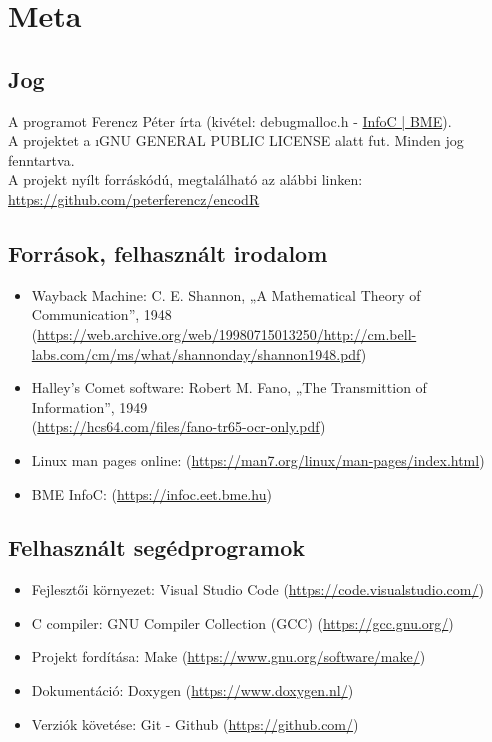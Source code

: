\chapter{Meta}
\section{Jog}
A programot Ferencz Péter írta (kivétel: debugmalloc.h - \href{https://infoc.eet.bme.hu/debugmalloc/}{InfoC | BME}). \\
A projektet a {\i GNU GENERAL PUBLIC LICENSE} alatt fut. Minden jog fenntartva.\\
A projekt nyílt forráskódú, megtalálható az alábbi linken: \href{https://github.com/peterferencz/encodR}{https://github.com/peterferencz/encodR}


\section{Források, felhasznált irodalom}
\begin{itemize}
    \item Wayback Machine: C. E. Shannon, „A Mathematical Theory of Communication”, 1948 \\
        (\href{https://web.archive.org/web/19980715013250/http://cm.bell-labs.com/cm/ms/what/shannonday/shannon1948.pdf}{https://web.archive.org/web/19980715013250/http://cm.bell-labs.com/cm/ms/what/shannonday/shannon1948.pdf})
    \item Halley's Comet software: Robert M. Fano, „The Transmittion of Information”, 1949 \\
        (\href{https://hcs64.com/files/fano-tr65-ocr-only.pdf}{https://hcs64.com/files/fano-tr65-ocr-only.pdf})
    \item Linux man pages online: (\href{https://man7.org/linux/man-pages/index.html}{https://man7.org/linux/man-pages/index.html})
    \item BME InfoC: (\href{https://infoc.eet.bme.hu}{https://infoc.eet.bme.hu})
\end{itemize}

\section{Felhasznált segédprogramok}
\begin{itemize}
    \item Fejlesztői környezet: Visual Studio Code (\href{https://code.visualstudio.com/}{https://code.visualstudio.com/})
    \item C compiler: GNU Compiler Collection (GCC) (\href{https://gcc.gnu.org/}{https://gcc.gnu.org/})
    \item Projekt fordítása: Make (\href{https://www.gnu.org/software/make/}{https://www.gnu.org/software/make/})
    \item Dokumentáció: Doxygen (\href{https://www.doxygen.nl/}{https://www.doxygen.nl/})
    \item Verziók követése: Git - Github (\href{https://github.com/}{https://github.com/})
\end{itemize}